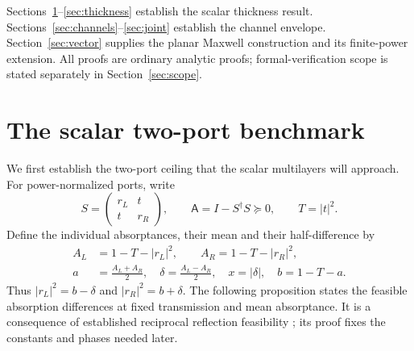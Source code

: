 \documentclass[11pt,a4paper]{article}
\theoremstyle{remark}
\newcommand{\abs}[1]{\lvert #1\rvert}
\begin{document}
Sections~\ref{sec:benchmark}--\ref{sec:thickness} establish the scalar thickness result. Sections~\ref{sec:channels}--\ref{sec:joint} establish the channel envelope. Section~\ref{sec:vector} supplies the planar Maxwell construction and its finite-power extension. All proofs are ordinary analytic proofs; formal-verification scope is stated separately in Section~\ref{sec:scope}.

\section{The scalar two-port benchmark}\label{sec:benchmark}
We first establish the two-port ceiling that the scalar multilayers will approach. For power-normalized ports, write
\begin{equation}\label{eq:twoport}
 S=\begin{pmatrix}r_L&t\\t&r_R\end{pmatrix},\qquad
 \mathsf A=I-S^\dagger S\succeq0,\qquad T=\abs t^2.
\end{equation}
Define the individual absorptances, their mean and their half-difference by
\begin{equation}\label{eq:scalar-variables}
 \begin{aligned}
 A_L&=1-T-\abs{r_L}^2,\qquad A_R=1-T-\abs{r_R}^2,\\
 a&=\frac{A_L+A_R}{2},\quad \delta=\frac{A_L-A_R}{2},\quad
 x=\abs\delta,\quad b=1-T-a.
 \end{aligned}
\end{equation}
Thus $\abs{r_L}^2=b-\delta$ and $\abs{r_R}^2=b+\delta$. The following proposition states the feasible absorption differences at fixed transmission and mean absorptance. It is a consequence of established reciprocal reflection feasibility \citep{GuoFan2022}; its proof fixes the constants and phases needed later.
\end{document}
